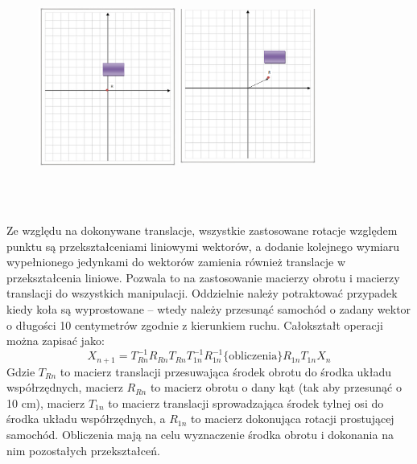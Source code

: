 \documentclass[a4paper, 12pt]{report}
\begin{document}
			\begin{figure}[H]
				\centering
				\includegraphics[height=8cm, width=0.4\textwidth]{./img/7.png}
				\includegraphics[height=8cm, width=0.4\textwidth]{./img/8.png}
			\end{figure}
			\noindent Ze względu na dokonywane translacje, wszystkie zastosowane rotacje względem punktu są przekształceniami liniowymi wektorów, a dodanie kolejnego wymiaru wypełnionego jedynkami do wektorów zamienia również translacje w przekształcenia liniowe. Pozwala to na zastosowanie macierzy obrotu i macierzy translacji do wszystkich manipulacji.
			\newline
			\newline
			Oddzielnie należy potraktować przypadek kiedy koła są wyprostowane -- wtedy należy przesunąć samochód o zadany wektor o długości 10 centymetrów zgodnie z kierunkiem ruchu.
			\newline 
			\newline
			Całokształt operacji można zapisać jako:
			$$
				X_{n+1} = T_{Rn}^{-1}R_{Rn}T_{Rn}T_{1n}^{-1}R_{1n}^{-1}\mathrm{\{obliczenia\}}R_{1n}T_{1n} X_{n}
			$$
			Gdzie $T_{Rn}$ to macierz translacji przesuwająca środek obrotu do środka układu współrzędnych, macierz $R_{Rn}$ to macierz obrotu o dany kąt (tak aby przesunąć o 10 cm), macierz $T_{1n}$ to macierz translacji sprowadzająca środek tylnej osi do środka układu współrzędnych, a $R_{1n}$ to macierz dokonująca rotacji prostującej samochód. Obliczenia mają na celu wyznaczenie środka obrotu i dokonania na nim pozostałych przekształceń.
		\newpage
\end{document}
